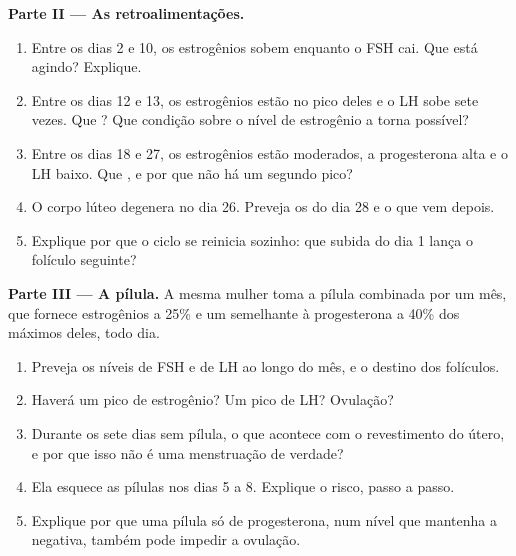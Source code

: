 \begin{problem}
\medskip
\noindent\textbf{Parte II --- As retroalimentações.}
\begin{enumerate}[resume]
  \item Entre os dias 2 e 10, os estrogênios sobem enquanto o FSH cai.
        Que  está agindo? Explique.
  \item Entre os dias 12 e 13, os estrogênios estão no pico deles e o
        LH sobe sete vezes. Que ? Que condição sobre o
        nível de estrogênio a torna possível?
  \item Entre os dias 18 e 27, os estrogênios estão moderados, a
        progesterona alta e o LH baixo. Que , e por que
        não há um segundo pico?
  \item O corpo lúteo degenera no dia 26. Preveja os  do dia
        28 e o que vem depois.
  \item Explique por que o ciclo se reinicia sozinho: que subida do dia
        1 lança o folículo seguinte?
\end{enumerate}

\medskip
\noindent\textbf{Parte III --- A pílula.}
A mesma mulher toma a pílula combinada por um mês, que fornece
estrogênios a 25\% e um  semelhante à progesterona a 40\% dos
máximos deles, todo dia.
\begin{enumerate}[resume]
  \item Preveja os níveis de FSH e de LH ao longo do mês, e o destino
        dos folículos.
  \item Haverá um pico de estrogênio? Um pico de LH? Ovulação?
  \item Durante os sete dias sem pílula, o que acontece com o
        revestimento do útero, e por que isso não é uma menstruação de
        verdade?
  \item Ela esquece as pílulas nos dias 5 a 8. Explique o risco, passo
        a passo.
  \item Explique por que uma pílula só de progesterona, num nível que
        mantenha a  negativa, também pode impedir a
        ovulação.
\end{enumerate}


\end{problem}
